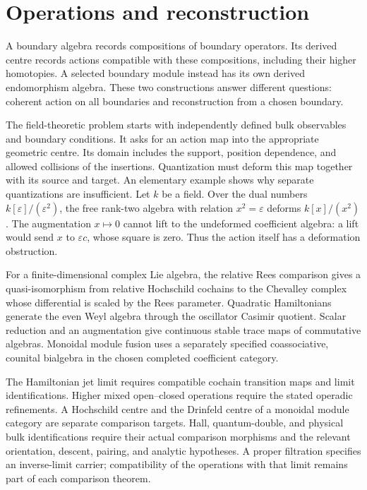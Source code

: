 \documentclass[11pt,twoside,openright]{memoir}
\begin{document}
\chapter*{Operations and reconstruction}
A boundary algebra records compositions of boundary operators. Its derived centre records actions compatible with these compositions, including their higher homotopies. A selected boundary module instead has its own derived endomorphism algebra. These two constructions answer different questions: coherent action on all boundaries and reconstruction from a chosen boundary.

The field-theoretic problem starts with independently defined bulk observables and boundary conditions. It asks for an action map into the appropriate geometric centre. Its domain includes the support, position dependence, and allowed collisions of the insertions. Quantization must deform this map together with its source and target. An elementary example shows why separate quantizations are insufficient. Let $k$ be a field. Over the dual numbers $k[\varepsilon]/(\varepsilon^2)$, the free rank-two algebra with relation $x^2=\varepsilon$ deforms $k[x]/(x^2)$. The augmentation $x\mapsto0$ cannot lift to the undeformed coefficient algebra: a lift would send $x$ to $\varepsilon c$, whose square is zero. Thus the action itself has a deformation obstruction.

For a finite-dimensional complex Lie algebra, the relative Rees comparison gives a quasi-isomorphism from relative Hochschild cochains to the Chevalley complex whose differential is scaled by the Rees parameter. Quadratic Hamiltonians generate the even Weyl algebra through the oscillator Casimir quotient. Scalar reduction and an augmentation give continuous stable trace maps of commutative algebras. Monoidal module fusion uses a separately specified coassociative, counital bialgebra in the chosen completed coefficient category.

The Hamiltonian jet limit requires compatible cochain transition maps and limit identifications. Higher mixed open--closed operations require the stated operadic refinements. A Hochschild centre and the Drinfeld centre of a monoidal module category are separate comparison targets. Hall, quantum-double, and physical bulk identifications require their actual comparison morphisms and the relevant orientation, descent, pairing, and analytic hypotheses. A proper filtration specifies an inverse-limit carrier; compatibility of the operations with that limit remains part of each comparison theorem.
\end{document}
